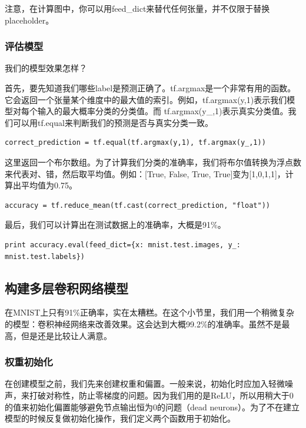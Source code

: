 \documentclass[a4paper,11pt,twoside]{ctexbook}
\begin{document}
注意，在计算图中，你可以用feed\_dict来替代任何张量，并不仅限于替换placeholder。

\subsubsection{评估模型}

我们的模型效果怎样？

首先，要先知道我们哪些label是预测正确了。tf.argmax是一个非常有用的函数。它会返回一个张量某个维度中的最大值的索引。例如，tf.argmax(y,1)表示我们模型对每个输入的最大概率分类的分类值。而 tf.argmax(y\_,1)表示真实分类值。我们可以用tf.equal来判断我们的预测是否与真实分类一致。

\begin{lstlisting}
correct_prediction = tf.equal(tf.argmax(y,1), tf.argmax(y_,1))
\end{lstlisting}

这里返回一个布尔数组。为了计算我们分类的准确率，我们将布尔值转换为浮点数来代表对、错，然后取平均值。例如：[True, False, True, True]变为[1,0,1,1]，计算出平均值为0.75。

\begin{lstlisting}
accuracy = tf.reduce_mean(tf.cast(correct_prediction, "float"))
\end{lstlisting}

最后，我们可以计算出在测试数据上的准确率，大概是91\%。

\begin{lstlisting}
print accuracy.eval(feed_dict={x: mnist.test.images, y_: mnist.test.labels})
\end{lstlisting}

\subsection{构建多层卷积网络模型}

在MNIST上只有91\%正确率，实在太糟糕。在这个小节里，我们用一个稍微复杂的模型：卷积神经网络来改善效果。这会达到大概99.2\%的准确率。虽然不是最高，但是还是比较让人满意。

\subsubsection{权重初始化}

在创建模型之前，我们先来创建权重和偏置。一般来说，初始化时应加入轻微噪声，来打破对称性，防止零梯度的问题。因为我们用的是ReLU，所以用稍大于0的值来初始化偏置能够避免节点输出恒为0的问题（dead neurons）。为了不在建立模型的时候反复做初始化操作，我们定义两个函数用于初始化。
\end{document}

